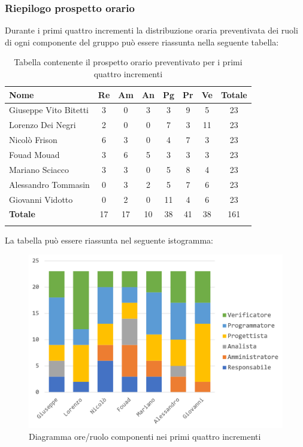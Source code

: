 		
		
		\subsubsection{Riepilogo prospetto orario}
		Durante i primi  quattro incrementi la distribuzione oraria preventivata dei ruoli di ogni componente del gruppo può essere riassunta nella seguente tabella:
		
		\begin{longtable}{|l|c|c|c|c|c|c|c|}
			\hline
			\rowcolor{lighter-grayer}
			\textbf{Nome} & \textbf{Re} & \textbf{Am} & \textbf{An} & \textbf{Pg}  & \textbf{Pr}   & \textbf{Ve} & \textbf{Totale} \\
			\hline
			\endfirsthead
			
			\hline
			Giuseppe Vito Bitetti 		 & 3 & 0 & 3 & 3 & 9 & 5 & 23\\
			\hline
			\hline
			Lorenzo Dei Negri			 & 2 & 0 & 0 & 7 & 3 & 11 & 23\\
			\hline
			\hline
			Nicolò Frison				    & 6 & 3 & 0 & 4 & 7 & 3 & 23\\
			\hline
			\hline
			Fouad Mouad 				 & 3 & 6 & 5 & 3 & 3 & 3 & 23\\
			\hline
			\hline
			Mariano Sciacco 			 & 3 & 3 & 0 & 5 & 8 & 4 & 23\\
			\hline
			\hline
			Alessandro Tommasin     & 0 & 3 & 2 & 5 & 7 & 6 & 23\\
			\hline
			\hline
			Giovanni Vidotto 			 & 0 & 2 & 0 & 11 & 4 & 6 & 23\\
			\hline 
			\textbf{Totale}			 		& 17 & 17 & 10 & 38 & 41 & 38 & 161\\
			\hline
			\caption{Tabella contenente il prospetto orario preventivato per i primi quattro incrementi}
		\end{longtable}
		\pagebreak
		
		La tabella può essere riassunta nel seguente istogramma:
		\begin{figure}[H]
			\centering
			\includegraphics[width=0.8\linewidth]{./images/preventivo/incremento1-4-1.png}
			\caption{Diagramma ore/ruolo componenti nei primi quattro incrementi}
			\label{fig:diagramma suddivione ruoli incrementi I-IV}
		\end{figure}
		
